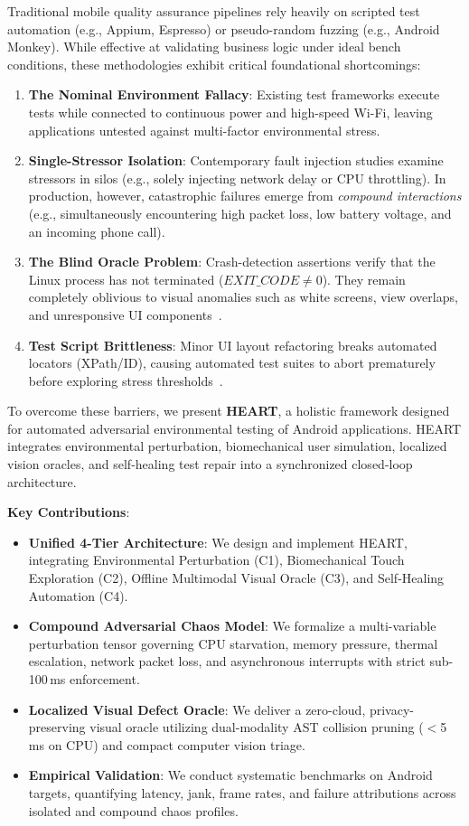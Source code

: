 \documentclass[conference]{IEEEtran}
\begin{document}
Traditional mobile quality assurance pipelines rely heavily on scripted test automation (e.g., Appium, Espresso) or pseudo-random fuzzing (e.g., Android Monkey). While effective at validating business logic under ideal bench conditions, these methodologies exhibit critical foundational shortcomings:
\begin{enumerate}
    \item \textbf{The Nominal Environment Fallacy}: Existing test frameworks execute tests while connected to continuous power and high-speed Wi-Fi, leaving applications untested against multi-factor environmental stress.
    \item \textbf{Single-Stressor Isolation}: Contemporary fault injection studies examine stressors in silos (e.g., solely injecting network delay or CPU throttling). In production, however, catastrophic failures emerge from \textit{compound interactions} (e.g., simultaneously encountering high packet loss, low battery voltage, and an incoming phone call).
    \item \textbf{The Blind Oracle Problem}: Crash-detection assertions verify that the Linux process has not terminated ($EXIT\_CODE \neq 0$). They remain completely oblivious to visual anomalies such as white screens, view overlaps, and unresponsive UI components~\cite{stocco2018apium,mariani2021automated}.
    \item \textbf{Test Script Brittleness}: Minor UI layout refactoring breaks automated locators (XPath/ID), causing automated test suites to abort prematurely before exploring stress thresholds~\cite{kirinuki2019self}.
\end{enumerate}

To overcome these barriers, we present \textbf{HEART}, a holistic framework designed for automated adversarial environmental testing of Android applications. HEART integrates environmental perturbation, biomechanical user simulation, localized vision oracles, and self-healing test repair into a synchronized closed-loop architecture.

\textbf{Key Contributions}:
\begin{itemize}
    \item \textbf{Unified 4-Tier Architecture}: We design and implement HEART, integrating Environmental Perturbation (C1), Biomechanical Touch Exploration (C2), Offline Multimodal Visual Oracle (C3), and Self-Healing Automation (C4).
    \item \textbf{Compound Adversarial Chaos Model}: We formalize a multi-variable perturbation tensor governing CPU starvation, memory pressure, thermal escalation, network packet loss, and asynchronous interrupts with strict sub-100\,ms enforcement.
    \item \textbf{Localized Visual Defect Oracle}: We deliver a zero-cloud, privacy-preserving visual oracle utilizing dual-modality AST collision pruning ($<$5\,ms on CPU) and compact computer vision triage.
    \item \textbf{Empirical Validation}: We conduct systematic benchmarks on Android targets, quantifying latency, jank, frame rates, and failure attributions across isolated and compound chaos profiles.
\end{itemize}
\end{document}
